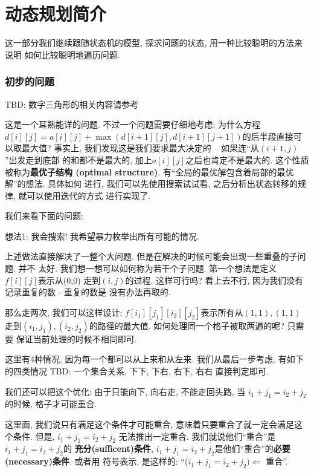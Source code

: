 \part{动态规划简介}

这一部分我们继续跟随状态机的模型, 探求问题的状态, 用一种比较聪明的方法来说明
如何比较聪明地遍历问题. 

\section{初步的问题}

 TBD: 数字三角形的相关内容请参考

这是一个耳熟能详的问题. 不过一个问题需要仔细地考虑: 为什么方程
$d[i][j]=a[i][j]+\max(d[i+1][j], d[i+1][j+1])$的后半段直接可以取最大值? 
事实上, 我们发现这是我们要求最大决定的 -- 如果连``从$(i+1,j)$''出发走到底部
的和都不是最大的, 加上$a[i][j]$之后也肯定不是最大的. 这个性质被称为\textbf{最优子结构
(optimal structure)}. 有``全局的最优解包含着局部的最优解''的想法. 具体如何
进行, 我们可以先使用搜索试试看, 之后分析出状态转移的规律, 就可以使用迭代的方式
进行实现了. 

我们来看下面的问题: 

 想法1: 我会搜索! 我希望暴力枚举出所有可能的情况. 

上述做法直接解决了一整个大问题. 但是在解决的时候可能会出现一些重叠的子问题. 并不
太好. 我们想一想可以如何称为若干个子问题. 第一个想法是定义$f[i][j]$表示从(0,0)
走到$(i,j)$的过程. 这样可行吗? 看上去不行, 因为我们没有记录重复的数 - 重复的数是
没有办法再取的. 

那么走两次, 我们可以这样设计: $f[i_1][j_1][i_2][j_2]$表示所有从$(1,1),(1,1)$
走到$(i_1,j_1),(i_2,j_2)$的路径的最大值. 如何处理同一个格子被取两遍的呢? 只需要
保证当前处理的时候不相同即可. 

这里有4种情况, 因为每一个都可以从上来和从左来. 我们从最后一步考虑, 有如下的四类情况
TBD: 一个集合关系, 下下, 下右, 右下, 右右 直接判定即可. 

我们还可以把这个优化: 由于只能向下, 向右走, 不能走回头路, 当
$i_1+j_1 = i_2 +j_2$的时候, 格子才可能重合. 

 这里面, 我们说只有满足这个条件才可能重合, 
意味着只要重合了就一定会满足这个条件. 但是, $i_1+j_1 = i_2 +j_2$
无法推出一定重合. 我们就说他们``重合''是$i_1+j_1 = i_2 +j_2$的
\textbf{充分(sufficent)条件}, 
$i_1+j_1 = i_2 +j_2$是他们``重合''的\textbf{必要(necessary)条件}. 或者用
符号表示, 是这样的: ``($i_1+j_1 = i_2 +j_2)\Leftarrow$ 重合''. 

